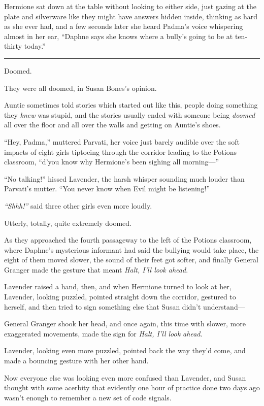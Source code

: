 Hermione sat down at the table without looking to either side, just
gazing at the plate and silverware like they might have answers hidden
inside, thinking as hard as she ever had, and a few seconds later she
heard Padma's voice whispering almost in her ear, ``Daphne says she
knows where a bully's going to be at ten-thirty today.''

\begin{center}\rule{3in}{0.4pt}\end{center}

Doomed.

They were all doomed, in Susan Bones's opinion.

Auntie sometimes told stories which started out like this, people doing
something they \emph{knew} was stupid, and the stories usually ended
with someone being \emph{doomed} all over the floor and all over the
walls and getting on Auntie's shoes.

``Hey, Padma,'' muttered Parvati, her voice just barely audible over the
soft impacts of eight girls tiptoeing through the corridor leading to
the Potions classroom, ``d'you know why Hermione's been sighing all
morning---''

``No talking!'' hissed Lavender, the harsh whisper sounding much louder
than Parvati's mutter. ``You never know when Evil might be listening!''

\emph{``Shhh!''} said three other girls even more loudly.

Utterly, totally, quite extremely doomed.

As they approached the fourth passageway to the left of the Potions
classroom, where Daphne's mysterious informant had said the bullying
would take place, the eight of them moved slower, the sound of their
feet got softer, and finally General Granger made the gesture that meant
\emph{Halt, I'll look ahead}.

Lavender raised a hand, then, and when Hermione turned to look at her,
Lavender, looking puzzled, pointed straight down the corridor, gestured
to herself, and then tried to sign something else that Susan didn't
understand---

General Granger shook her head, and once again, this time with slower,
more exaggerated movements, made the sign for \emph{Halt, I'll look
ahead}.

Lavender, looking even more puzzled, pointed back the way they'd come,
and made a bouncing gesture with her other hand.

Now everyone else was looking even more confused than Lavender, and
Susan thought with some acerbity that evidently one hour of practice
done two days ago wasn't enough to remember a new set of code signals.

